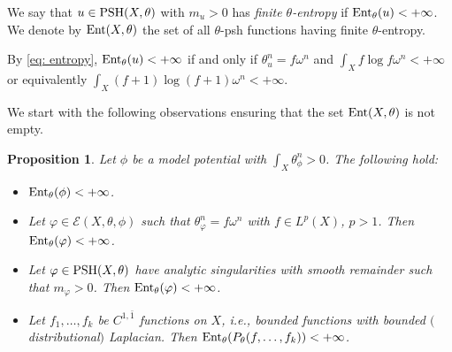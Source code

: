 \documentclass[pdftex]{sigma}
\numberwithin{equation}{section}
\newtheorem{Proposition}[Theorem]{Proposition}
{ \theoremstyle{definition}
\newtheorem{Definition}[Theorem]{Definition}
\newtheorem{Note}[Theorem]{Note}
\newtheorem{Example}[Theorem]{Example}
\newtheorem{Remark}[Theorem]{Remark}
\newtheorem{Question}[Theorem]{Question}
}
\theoremstyle{plain}
\newcommand \psh {{\rm PSH}}
\newcommand \Ent{{\rm Ent}}
\begin{document}
\begin{Definition}\label{def: entropy}
 We say that $u\in \psh(X, \theta)$ with $m_u>0$ has \emph{finite $\theta$-entropy} if ${\rm Ent}_\theta(u)<+\infty$. We denote by ${\rm Ent}(X, \theta)$ the set of all $\theta$-psh functions having finite $\theta$-entropy.
\end{Definition}
 By \eqref{eq: entropy}, ${\rm Ent}_\theta(u)<+\infty$ if and only if $\theta_u^n=f\omega^n$ and $\int_X f\log f\omega^n<+\infty$ or equivalently $\int_X (f+1)\log (f+1)\omega^n<+\infty$.

We start with the following observations ensuring that the set ${\rm Ent}(X, \theta)$ is not empty.

\begin{Proposition}\label{env} Let $\phi$ be a model potential with $\int_X \theta_\phi^n >0$. The following hold:
\begin{itemize}\itemsep=0pt
 \item[$(i)$] $\Ent_\theta(\phi)<+\infty$.

\item[$(ii)$] Let $\varphi\in \mathcal{E}(X, \theta, \phi)$ such that $\theta_\varphi^n =f \omega^n$ with $f\in L^p(X)$, $p>1$. Then ${\rm Ent}_\theta(\varphi)<+\infty$.

\item[$(iii)$] Let $\varphi\in \psh(X, \theta)$ have analytic singularities with smooth remainder such that $m_\varphi>0$. Then ${\rm Ent}_\theta(\varphi)<+\infty$.

\item[$(iv)$] Let $f_1, \dots,f_k$ be $C^{1,\bar{1}}$ functions on $X$, i.e., bounded functions with bounded $($distributional$)$ Laplacian. Then
 ${\rm Ent}_\theta(P_{\theta}(f,\dots,f_k))<+\infty $.
\end{itemize}
\end{Proposition}
\end{document}
